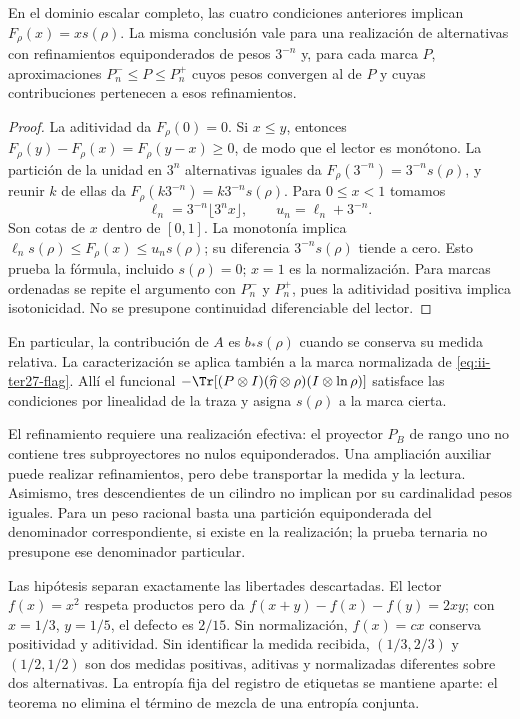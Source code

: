 \begin{theorem}
\label{thm:ii-tins-additive}
En el dominio escalar completo, las cuatro condiciones anteriores implican
$F_\rho(x)=xs(\rho)$. La misma conclusión vale para una realización de
alternativas con refinamientos equiponderados de pesos $3^{-n}$ y, para
cada marca $P$, aproximaciones $P_n^-\le P\le P_n^+$ cuyos pesos convergen
al de $P$ y cuyas contribuciones pertenecen a esos refinamientos.
\end{theorem}
\begin{proof}
La aditividad da $F_\rho(0)=0$. Si $x\le y$, entonces
$F_\rho(y)-F_\rho(x)=F_\rho(y-x)\ge0$, de modo que el lector es monótono.
La partición de la unidad en $3^n$ alternativas iguales da
$F_\rho(3^{-n})=3^{-n}s(\rho)$, y reunir $k$ de ellas da
$F_\rho(k3^{-n})=k3^{-n}s(\rho)$. Para $0\le x<1$ tomamos
\[
 \ell_n=3^{-n}\lfloor3^nx\rfloor,\qquad u_n=\ell_n+3^{-n}.
\]
Son cotas de $x$ dentro de $[0,1]$. La monotonía implica
$\ell_ns(\rho)\le F_\rho(x)\le u_ns(\rho)$; su diferencia
$3^{-n}s(\rho)$ tiende a cero. Esto prueba la fórmula, incluido
$s(\rho)=0$; $x=1$ es la normalización. Para marcas ordenadas se repite
el argumento con $P_n^-$ y $P_n^+$, pues la aditividad positiva implica
isotonicidad. No se presupone continuidad diferenciable del lector.
\end{proof}

En particular, la contribución de $A$ es $b_*s(\rho)$ cuando se conserva
su medida relativa. La caracterización se aplica también a la marca
normalizada de \eqref{eq:ii-ter27-flag}. Allí el funcional
$-\Tr[(P\otimes I)(\widehat\eta\otimes\rho)(I\otimes\ln\rho)]$
satisface las condiciones por linealidad de la traza y asigna $s(\rho)$
a la marca cierta.

El refinamiento requiere una realización efectiva: el proyector $P_B$ de
rango uno no contiene tres subproyectores no nulos equiponderados. Una
ampliación auxiliar puede realizar refinamientos, pero debe transportar
la medida y la lectura. Asimismo, tres descendientes de un cilindro no
implican por su cardinalidad pesos iguales. Para un peso racional basta
una partición equiponderada del denominador correspondiente, si existe en
la realización; la prueba ternaria no presupone ese denominador particular.

Las hipótesis separan exactamente las libertades descartadas. El lector
$f(x)=x^2$ respeta productos pero da
$f(x+y)-f(x)-f(y)=2xy$; con $x=1/3$, $y=1/5$, el defecto es $2/15$.
Sin normalización, $f(x)=cx$ conserva positividad y aditividad. Sin
identificar la medida recibida, $(1/3,2/3)$ y $(1/2,1/2)$ son dos medidas
positivas, aditivas y normalizadas diferentes sobre dos alternativas.
La entropía fija del registro de etiquetas se mantiene aparte: el teorema
no elimina el término de mezcla de una entropía conjunta.

